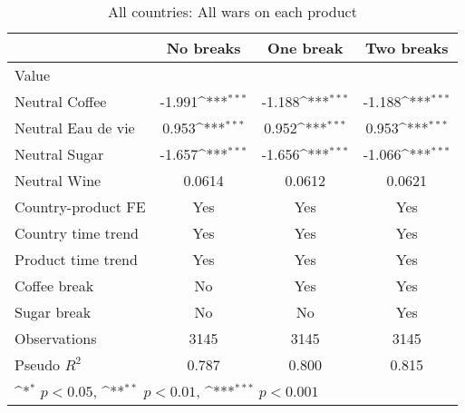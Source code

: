 \begin{table}[htbp]\centering
\def\sym#1{\ifmmode^{#1}\else\(^{#1}\)\fi}
\caption{All countries: All wars on each product\label{tab1}}
\begin{tabular}{l*{3}{c}}
\hline\hline
                    &\multicolumn{1}{c}{No breaks}&\multicolumn{1}{c}{One break}&\multicolumn{1}{c}{Two breaks}\\
\hline
Value               &                     &                     &                     \\
Neutral Coffee      &      -1.991\sym{***}&      -1.188\sym{***}&      -1.188\sym{***}\\
Neutral Eau de vie  &       0.953\sym{***}&       0.952\sym{***}&       0.953\sym{***}\\
Neutral Sugar       &      -1.657\sym{***}&      -1.656\sym{***}&      -1.066\sym{***}\\
Neutral Wine        &      0.0614         &      0.0612         &      0.0621         \\
Country-product FE  &         Yes         &         Yes         &         Yes         \\
Country time trend  &         Yes         &         Yes         &         Yes         \\
Product time trend  &         Yes         &         Yes         &         Yes         \\
Coffee break        &          No         &         Yes         &         Yes         \\
Sugar break         &          No         &          No         &         Yes         \\
\hline
Observations        &        3145         &        3145         &        3145         \\
Pseudo \(R^{2}\)    &       0.787         &       0.800         &       0.815         \\
\hline\hline
\multicolumn{4}{l}{\footnotesize \sym{*} \(p<0.05\), \sym{**} \(p<0.01\), \sym{***} \(p<0.001\)}\\
\end{tabular}
\end{table}
